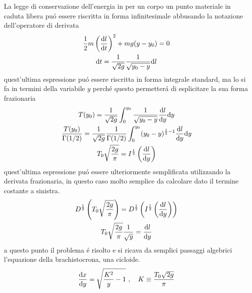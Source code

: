 

\usepackage[italian]{babel}





\begin{multicols*}{3}
  
  La legge di conservazione dell'energia in per un corpo un punto materiale in caduta libera pu\'o essere
  riscritta in forma infinitesimale abbusando la notazione dell'operatore di derivata
  \begin{equation}
    \begin{gathered}
      \frac{1}{2}m\left(\dv{l}{t}\right)^2 + mg(y-y_0) = 0 \\
      \text{d}t = \frac{1}{\sqrt{2g}}\frac{1}{\sqrt{y_0 - y}}\text{d}l
    \end{gathered}
  \end{equation}
  quest'ultima espressione pu\'o essere riscritta in forma integrale standard, ma lo si fa in termini della
  variabile $y$ perch\'e questo permetter\'a di esplicitare la sua forma frazionaria
  \begin{equation}
    \begin{gathered}
      T(y_0) = \frac{1}{\sqrt{2g}} \int_{0}^{y_0} \frac{1}{\sqrt{y_0 - y}}\dv{l}{y}\text{d}y \\
      \frac{T(y_0)}{\Gamma(1/2)} = \frac{1}{\sqrt{2g}}\frac{1}{\Gamma(1/2)}\int_{0}^{y_0} (y_0 - y)^{\frac{1}{2}-1}\dv{l}{y}\text{d}y \\
      T_0\sqrt{\frac{2g}{\pi}} = I^{\frac{1}{2}}\left(\dv{l}{y}\right)
    \end{gathered}
  \end{equation}
  quest'ultima espressione pu\'o essere ulteriormente semplificata utilizzando la derivata frazionaria,
  in questo caso molto semplice da calcolare dato il termine costante a sinistra.
  \begin{equation}
    \begin{gathered}
      D^{\frac{1}{2}}\left(T_0\sqrt{\frac{2g}{\pi}}\right) = D^{\frac{1}{2}}\left(I^{\frac{1}{2}}\left(\dv{l}{y}\right)\right) \\
      T_0\sqrt{\frac{2g}{\pi}}\frac{1}{\sqrt{y}} = \dv{l}{y} \\
    \end{gathered}
  \end{equation}
  a questo punto il problema \'e risolto e si ricava da semplici passaggi algebrici l'equazione della brachistocrona, una cicloide.
  \begin{equation}
    \dv{x}{y} = \sqrt{\frac{K^2}{y} - 1} ~, \quad K \equiv \frac{T_0\sqrt{2g}}{\pi}
  \end{equation}

\end{multicols*}


